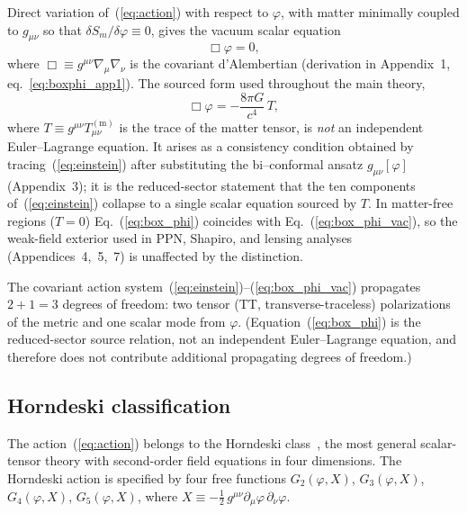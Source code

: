\documentclass[aps,prd,onecolumn,superscriptaddress,nofootinbib,showpacs,12pt]{revtex4-2}
\begin{document}
Direct variation of~(\ref{eq:action}) with respect to
$\varphi$, with matter minimally coupled to $g_{\mu\nu}$
so that $\delta S_m/\delta\varphi \equiv 0$, gives the
vacuum scalar equation
\begin{equation}\label{eq:box_phi_vac}
  \Box\varphi = 0,
\end{equation}
where $\Box \equiv g^{\mu\nu}\nabla_{\mu}\nabla_{\nu}$ is
the covariant d'Alembertian (derivation in Appendix~1,
eq.~\ref{eq:boxphi_app1}). The sourced form used throughout
the main theory,
\begin{equation}\label{eq:box_phi}
  \Box\varphi = -\frac{8\pi G}{c^{4}}\,T,
\end{equation}
where $T \equiv g^{\mu\nu}T_{\mu\nu}^{(\mathrm{m})}$ is the
trace of the matter tensor, is \emph{not} an independent
Euler--Lagrange equation. It arises as a consistency
condition obtained by tracing~(\ref{eq:einstein}) after
substituting the bi--conformal ansatz $g_{\mu\nu}[\varphi]$
(Appendix~3); it is the reduced-sector statement that the
ten components of~(\ref{eq:einstein}) collapse to a single
scalar equation sourced by $T$.  In matter-free regions
($T=0$) Eq.~(\ref{eq:box_phi}) coincides with
Eq.~(\ref{eq:box_phi_vac}), so the weak-field exterior
used in PPN, Shapiro, and lensing analyses
(Appendices~4,~5,~7) is unaffected by the distinction.

The covariant action system~(\ref{eq:einstein})--(\ref{eq:box_phi_vac})
propagates $2 + 1 = 3$ degrees of freedom: two tensor
(TT, transverse-traceless) polarizations of the metric and one scalar
mode from $\varphi$. (Equation~(\ref{eq:box_phi}) is the reduced-sector
source relation, not an independent Euler--Lagrange equation, and
therefore does not contribute additional propagating degrees of freedom.)

\subsection{Horndeski classification}\label{sec:horndeski}

The action~(\ref{eq:action}) belongs to the Horndeski
class~\cite{Horndeski1974}, the most general scalar-tensor
theory with second-order field equations in four dimensions.
The Horndeski action is specified by four free functions
$G_{2}(\varphi,X)$, $G_{3}(\varphi,X)$,
$G_{4}(\varphi,X)$, $G_{5}(\varphi,X)$, where
$X \equiv -\frac{1}{2}\,g^{\mu\nu}\partial_{\mu}\varphi\,
\partial_{\nu}\varphi$.
\end{document}
